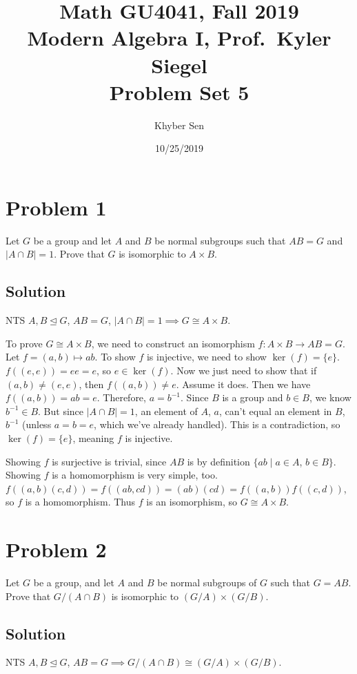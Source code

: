 \documentclass[fleqn]{article}
\title{
Math GU4041, Fall 2019 \\
Modern Algebra I, Prof.\ Kyler Siegel \\
Problem Set 5
}
\author{Khyber Sen}
\date{10/25/2019}
\begin{document}
    
    \maketitle
    
    \section{Problem 1}
    Let $G$ be a group and let $A$ and $B$ be normal subgroups such that $AB = G$ and $|A \cap B| = 1$.  Prove that $G$ is isomorphic to $A \times B$.
        
        \subsection{Solution}
        NTS $A, B \unlhd G$, $AB = G$, $|A \cap B| = 1 \implies G \cong A \times B$.
        
        To prove $G \cong A \times B$, we need to construct an isomorphism $f: A \times B \to AB = G$.  Let $f = (a, b) \mapsto ab$.  To show $f$ is injective, we need to show $\ker(f) = \{e\}$.  $f((e, e)) = ee = e$, so $e \in \ker(f)$.  Now we just need to show that if $(a, b) \neq (e, e)$, then $f((a, b)) \neq e$.  Assume it does.  Then we have $f((a, b)) = ab = e$.  Therefore, $a = b^{-1}$.  Since $B$ is a group and $b \in B$, we know $b^{-1} \in B$.  But since $|A \cap B| = 1$, an element of $A$, $a$, can't equal an element in $B$, $b^{-1}$ (unless $a = b = e$, which we've already handled).  This is a contradiction, so $\ker(f) = \{e\}$, meaning $f$ is injective.
        
        Showing $f$ is surjective is trivial, since $AB$ is by definition $\{ab \mid a \in A$, $b \in B\}$.  Showing $f$ is a homomorphism is very simple, too.  $f((a, b)(c, d)) = f((ab, cd)) = (ab)(cd) = f((a, b)) f((c, d))$, so $f$ is a homomorphism.  Thus $f$ is an isomorphism, so $G \cong A \times B$.
    
    \section{Problem 2}
    Let $G$ be a group, and let $A$ and $B$ be normal subgroups of $G$ such that $G = AB$.  Prove that $G/(A \cap B)$ is isomorphic to $(G/A) \times (G/B)$.
        
        \subsection{Solution}
        NTS $A, B \unlhd G$, $AB = G \implies G/(A \cap B) \cong (G/A) \times (G/B)$.
        
\end{document}

